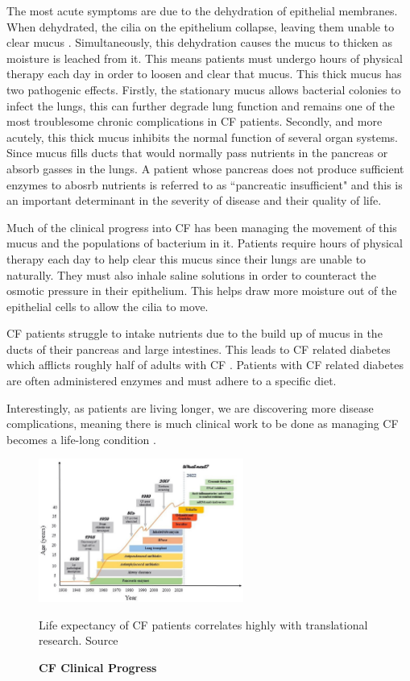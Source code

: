 The most acute symptoms are due to the dehydration of epithelial membranes. When dehydrated, the cilia on the epithelium collapse, leaving them unable to clear mucus \cite{boucher2007}.  Simultaneously, this dehydration causes the mucus to thicken as moisture is leached from it. This means patients must undergo hours of physical therapy each day in order to loosen and clear that mucus. This thick mucus has two pathogenic effects. Firstly, the stationary mucus allows bacterial colonies to infect the lungs, this can further degrade lung function and remains one of the most troublesome chronic complications in CF patients. Secondly,  and more acutely, this thick mucus inhibits the normal function of several organ systems. Since mucus fills ducts that would normally pass nutrients in the pancreas or absorb gasses in the lungs. A patient whose pancreas does not produce sufficient enzymes to abosrb nutrients is referred to as ``pancreatic insufficient" and this is an important determinant in the severity of disease and their quality of life.

Much of the clinical progress into CF has been managing the movement of this mucus and the populations of bacterium in it. Patients require hours of physical therapy each day to help clear this mucus since their lungs are unable to naturally. They must also inhale saline solutions in order to counteract the osmotic pressure in their epithelium. This helps draw more moisture out of the epithelial cells to allow the cilia to move. 

CF patients struggle to intake nutrients due to the build up of mucus in the ducts of their pancreas and large intestines. This leads to CF related diabetes which afflicts roughly half of adults with CF \cite{Kayani2018}. Patients with CF related diabetes are often administered enzymes and must adhere to a specific diet. 

Interestingly, as patients are living longer, we are discovering more disease complications, meaning there is much clinical work to be done as managing CF becomes a life-long condition \cite{stalvey2013}. 

\begin{figure}
	\label{CF_life_expectancy}
	\begin{center}
	\includegraphics[width=0.6\textwidth]{figures/CF_life_expectancy.png}
	\end{center}
	\captionsetup{singlelinecheck = false, justification=raggedright}
	\caption[CF Clinical Progress] {\textbf{CF Clinical Progress}}{Life expectancy of CF patients correlates highly with translational research. Source \cite{garcia2022}} 
\end{figure}

